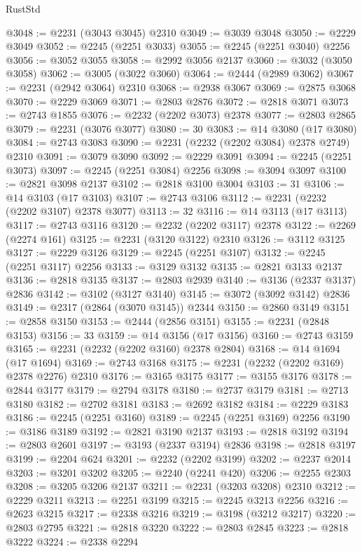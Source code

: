 \begin{lexlean}{RustStd}
\begin{coremodule}
@3048 := @2231 (@3043 @3045) @2310
@3049 := @3039 @3048
@3050 := @2229 @3049
@3052 := @2245 (@2251 @3033)
@3055 := @2245 (@2251 @3040) @2256
@3056 := @3052 @3055
@3058 := @2992 @3056 @2137
@3060 := @3032 (@3050 @3058)
@3062 := @3005 (@3022 @3060)
@3064 := @2444 (@2989 @3062)
@3067 := @2231 (@2942 @3064) @2310
@3068 := @2938 @3067
@3069 := @2875 @3068
@3070 := @2229 @3069
@3071 := @2803 @2876
@3072 := @2818 @3071
@3073 := @2743 @1855
@3076 := @2232 (@2202 @3073) @2378
@3077 := @2803 @2865
@3079 := @2231 (@3076 @3077)
@3080 := 30
@3083 := @14 @3080 (@17 @3080)
@3084 := @2743 @3083
@3090 := @2231 (@2232 (@2202 @3084) @2378 @2749) @2310
@3091 := @3079 @3090
@3092 := @2229 @3091
@3094 := @2245 (@2251 @3073)
@3097 := @2245 (@2251 @3084) @2256
@3098 := @3094 @3097
@3100 := @2821 @3098 @2137
@3102 := @2818 @3100 @3004
@3103 := 31
@3106 := @14 @3103 (@17 @3103)
@3107 := @2743 @3106
@3112 := @2231 (@2232 (@2202 @3107) @2378 @3077)
@3113 := 32
@3116 := @14 @3113 (@17 @3113)
@3117 := @2743 @3116
@3120 := @2232 (@2202 @3117) @2378
@3122 := @2269 (@2274 @161)
@3125 := @2231 (@3120 @3122) @2310
@3126 := @3112 @3125
@3127 := @2229 @3126
@3129 := @2245 (@2251 @3107)
@3132 := @2245 (@2251 @3117) @2256
@3133 := @3129 @3132
@3135 := @2821 @3133 @2137
@3136 := @2818 @3135
@3137 := @2803 @2939
@3140 := @3136 (@2337 @3137) @2836
@3142 := @3102 (@3127 @3140)
@3145 := @3072 (@3092 @3142) @2836
@3149 := @2317 (@2864 (@3070 @3145)) @2344
@3150 := @2860 @3149
@3151 := @2858 @3150
@3153 := @2444 (@2856 @3151)
@3155 := @2231 (@2848 @3153)
@3156 := 33
@3159 := @14 @3156 (@17 @3156)
@3160 := @2743 @3159
@3165 := @2231 (@2232 (@2202 @3160) @2378 @2804)
@3168 := @14 @1694 (@17 @1694)
@3169 := @2743 @3168
@3175 := @2231 (@2232 (@2202 @3169) @2378 @2276) @2310
@3176 := @3165 @3175
@3177 := @3155 @3176
@3178 := @2844 @3177
@3179 := @2794 @3178
@3180 := @2737 @3179
@3181 := @2713 @3180
@3182 := @2702 @3181
@3183 := @2692 @3182
@3184 := @2229 @3183
@3186 := @2245 (@2251 @3160)
@3189 := @2245 (@2251 @3169) @2256
@3190 := @3186 @3189
@3192 := @2821 @3190 @2137
@3193 := @2818 @3192
@3194 := @2803 @2601
@3197 := @3193 (@2337 @3194) @2836
@3198 := @2818 @3197
@3199 := @2204 @624
@3201 := @2232 (@2202 @3199)
@3202 := @2237 @2014
@3203 := @3201 @3202
@3205 := @2240 (@2241 @420)
@3206 := @2255 @2303
@3208 := @3205 @3206 @2137
@3211 := @2231 (@3203 @3208) @2310
@3212 := @2229 @3211
@3213 := @2251 @3199
@3215 := @2245 @3213 @2256
@3216 := @2623 @3215
@3217 := @2338 @3216
@3219 := @3198 (@3212 @3217)
@3220 := @2803 @2795
@3221 := @2818 @3220
@3222 := @2803 @2845
@3223 := @2818 @3222
@3224 := @2338 @2294

\end{coremodule}
\end{lexlean}
